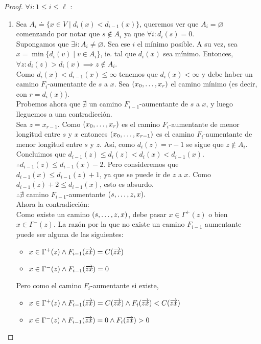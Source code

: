 \begin{proof}
  $\forall i : 1 \le i \le \ell$ :\\
  \begin{enumerate}
  \item
    Sea $A_i \doteq \{x \in V \mid d_i(x) < d_{i-1}(x)\}$, queremos ver que 
    $A_i = \varnothing$ comenzando por notar que $s \notin A_i$ ya que $\forall i: d_i(s) = 0$.\\
    Supongamos que $\exists i : A_i \neq \varnothing$. Sea ese $i$ el mínimo posible. 
    A su vez, sea $x = \min\{d_i(v) \mid v \in A_i \}$, ie. tal que $d_i(x)$ sea mínimo. 
    Entonces, $\forall z : d_i(z) > d_i(x) \implies z\notin A_i$.\\
    Como $d_i(x) < d_{i-1}(x) \le \infty$ tenemos que $d_i(x) < \infty$ y debe 
    haber un camino $F_i$-aumentante de $s$ a $x$. 
    Sea $(x_0, \mathellipsis, x_r)$ el camino mínimo (es decir, con $r = d_i(x)$).\\
    Probemos ahora que $\nexists$ un camino $F_{i-1}$-aumentante de $s$ a $x$, 
    y luego lleguemos a una contradicción.\\
    Sea $z = x_{r-1}$. Como $(x_0,\mathellipsis, x_r)$ es el camino 
    $F_i$-aumentante de menor longitud entre $s$ y $x$ entonces 
    $(x_0, \mathellipsis, x_{r-1})$ es el camino $F_{i}$-aumentante de menor 
    longitud entre $s$ y $z$. Así, como $d_i(z) = r-1$ se sigue que $z \notin A_i$. 
    Concluimos que $d_{i-1}(z) \le d_i(z) < d_i(x) < d_{i-1}(x)$. \\
    $\therefore d_{i-1}(z) \le d_{i-1}(x)-2$.
    Pero consideremos que $d_{i-1}(x) \le d_{i-1}(z) + 1$, ya que se puede ir de $z$ a $x$.
    Como $d_{i-1}(z)+2 \le d_{i-1}(x)$, esto es absurdo.\\
    $\therefore \nexists$ camino $F_{i-1}$-aumentante $(s,\mathellipsis, z, x).$\\
    Ahora la contradicción:\\
    Como existe un camino $(s, \mathellipsis, z, x)$, debe pasar $x \in \Gamma^+(z)$ o bien $x \in \Gamma^-(z)$. La razón por la que no existe un camino $F_{i-1}$ aumentante puede ser alguna de las siguientes:
    \begin{itemize}
    \item $x \in \Gamma^+(z) \wedge F_{i-1}(\overrightarrow{zx}) = C(\overrightarrow{zx})$
    \item $x \in \Gamma^-(z) \wedge F_{i-1}(\overrightarrow{zx}) = 0$ 
    \end{itemize}
    Pero como el camino $F_i$-aumentante si existe,
    \begin{itemize}
    \item $x \in \Gamma^+(z) \wedge F_{i-1}(\overrightarrow{zx}) = C(\overrightarrow{zx}) \wedge F_i(\overrightarrow{zx}) < C(\overrightarrow{zx})$
    \item $x \in \Gamma^-(z) \wedge F_{i-1}(\overrightarrow{zx}) = 0 \wedge F_i(\overrightarrow{zx}) > 0$
    \end{itemize}
    

\end{enumerate}
\end{proof}
